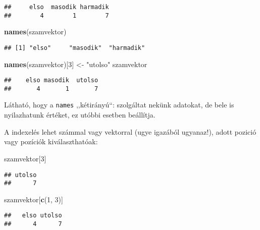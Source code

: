 \documentclass[]{book}
\newenvironment{Shaded}{\begin{snugshade}}{\end{snugshade}}
\newcommand{\KeywordTok}[1]{\textcolor[rgb]{0.13,0.29,0.53}{\textbf{#1}}}
\newcommand{\DecValTok}[1]{\textcolor[rgb]{0.00,0.00,0.81}{#1}}
\newcommand{\StringTok}[1]{\textcolor[rgb]{0.31,0.60,0.02}{#1}}
\newcommand{\NormalTok}[1]{#1}
\begin{document}
\begin{verbatim}
##     elso  masodik harmadik 
##        4        1        7
\end{verbatim}

\begin{Shaded}
\begin{Highlighting}[]
\KeywordTok{names}\NormalTok{(szamvektor)}
\end{Highlighting}
\end{Shaded}

\begin{verbatim}
## [1] "elso"     "masodik"  "harmadik"
\end{verbatim}

\begin{Shaded}
\begin{Highlighting}[]
\KeywordTok{names}\NormalTok{(szamvektor)[}\DecValTok{3}\NormalTok{] <-}\StringTok{ "utolso"}
\NormalTok{szamvektor}
\end{Highlighting}
\end{Shaded}

\begin{verbatim}
##    elso masodik  utolso 
##       4       1       7
\end{verbatim}

Látható, hogy a \texttt{names} ,,kétirányú``: szolgáltat nekünk
adatokat, de bele is nyilazhatunk értéket, ez utóbbi esetben beállítja.

A indexelés lehet számmal vagy vektorral (ugye igazából ugyanaz!), adott
pozició vagy pozíciók kiválaszthatóak:

\begin{Shaded}
\begin{Highlighting}[]
\NormalTok{szamvektor[}\DecValTok{3}\NormalTok{]}
\end{Highlighting}
\end{Shaded}

\begin{verbatim}
## utolso 
##      7
\end{verbatim}

\begin{Shaded}
\begin{Highlighting}[]
\NormalTok{szamvektor[}\KeywordTok{c}\NormalTok{(}\DecValTok{1}\NormalTok{, }\DecValTok{3}\NormalTok{)]}
\end{Highlighting}
\end{Shaded}

\begin{verbatim}
##   elso utolso 
##      4      7
\end{verbatim}
\end{document}
